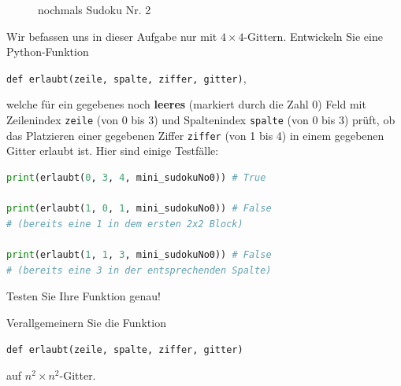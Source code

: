 \begin{figure}[H]
	\caption{nochmals Sudoku Nr. 2}
	\label{fig:sudoku0again}
\end{figure}

\clearpage
\begin{myexercise}\label{myexercise:0688}
	Wir befassen uns in dieser Aufgabe nur mit $4\times 4$-Gittern. Entwickeln Sie eine Python-Funktion
	\begin{center}
		\lstinline|def erlaubt(zeile, spalte, ziffer, gitter)|,
	\end{center}
	welche für ein gegebenes noch \textbf{leeres} (markiert durch die Zahl 0) Feld mit Zeilenindex \lstinline|zeile| (von 0 bis 3) und Spaltenindex \lstinline|spalte| (von 0 bis 3) prüft, ob das Platzieren einer gegebenen Ziffer \lstinline|ziffer| (von 1 bis 4) in einem gegebenen Gitter erlaubt ist. Hier sind einige Testfälle:
	\begin{lstlisting}[language=Python,caption=erlaubt oder nicht,numbers=none]
print(erlaubt(0, 3, 4, mini_sudokuNo0)) # True

print(erlaubt(1, 0, 1, mini_sudokuNo0)) # False
# (bereits eine 1 in dem ersten 2x2 Block)

print(erlaubt(1, 1, 3, mini_sudokuNo0)) # False
# (bereits eine 3 in der entsprechenden Spalte)
\end{lstlisting}
	Testen Sie Ihre Funktion genau!
\end{myexercise}

\begin{myexercise}\label{myexercise:0689}
	Verallgemeinern Sie die Funktion
	\begin{center}
		\lstinline|def erlaubt(zeile, spalte, ziffer, gitter)|
	\end{center}
	auf $n^2\times n^2$-Gitter.
\end{myexercise}

